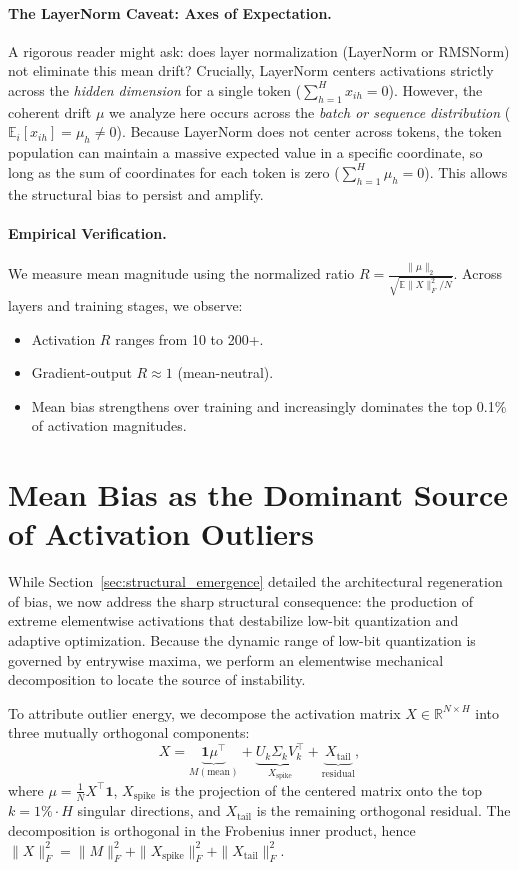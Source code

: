 \paragraph{The LayerNorm Caveat: Axes of Expectation.}
A rigorous reader might ask: does layer normalization (LayerNorm or RMSNorm) not eliminate this mean drift? Crucially, LayerNorm centers activations strictly across the \textit{hidden dimension} for a single token ($\sum_{h=1}^H x_{ih} = 0$). However, the coherent drift $\mu$ we analyze here occurs across the \textit{batch or sequence distribution} ($\mathbb{E}_i[x_{ih}] = \mu_h \neq 0$). Because LayerNorm does not center across tokens, the token population can maintain a massive expected value in a specific coordinate, so long as the sum of coordinates for each token is zero ($\sum_{h=1}^H \mu_h = 0$). This allows the structural bias to persist and amplify.

\paragraph{Empirical Verification.} We measure mean magnitude using the normalized ratio $R = \frac{\|\mu\|_2}{\sqrt{\mathbb{E}\|X\|_F^2/N}}$. Across layers and training stages, we observe:
\begin{itemize}
    \item Activation $R$ ranges from 10 to 200+.
    \item Gradient-output $R \approx 1$ (mean-neutral).
    \item Mean bias strengthens over training and increasingly dominates the top 0.1\% of activation magnitudes.
\end{itemize}

\section{Mean Bias as the Dominant Source of Activation Outliers}
\label{sec:activation_outliers}

While Section~\ref{sec:structural_emergence} detailed the architectural regeneration of bias, we now address the sharp structural consequence: the production of extreme elementwise activations that destabilize low-bit quantization and adaptive optimization. Because the dynamic range of low-bit quantization is governed by entrywise maxima, we perform an elementwise mechanical decomposition to locate the source of instability.

To attribute outlier energy, we decompose the activation matrix $X \in \mathbb{R}^{N \times H}$ into three mutually orthogonal components:
\begin{equation}
X = \underbrace{\mathbf{1}\mu^\top}_{M (\text{mean})} + \underbrace{U_k \Sigma_k V_k^\top}_{X_{\text{spike}}} + \underbrace{X_{\text{tail}}}_{\text{residual}},
\end{equation}
where $\mu = \frac{1}{N}X^\top \mathbf{1}$, $X_{\text{spike}}$ is the projection of the centered matrix onto the top $k = 1\% \cdot H$ singular directions, and $X_{\text{tail}}$ is the remaining orthogonal residual. The decomposition is orthogonal in the Frobenius inner product, hence $\|X\|_F^2 = \|M\|_F^2 + \|X_{\text{spike}}\|_F^2 + \|X_{\text{tail}}\|_F^2$.

